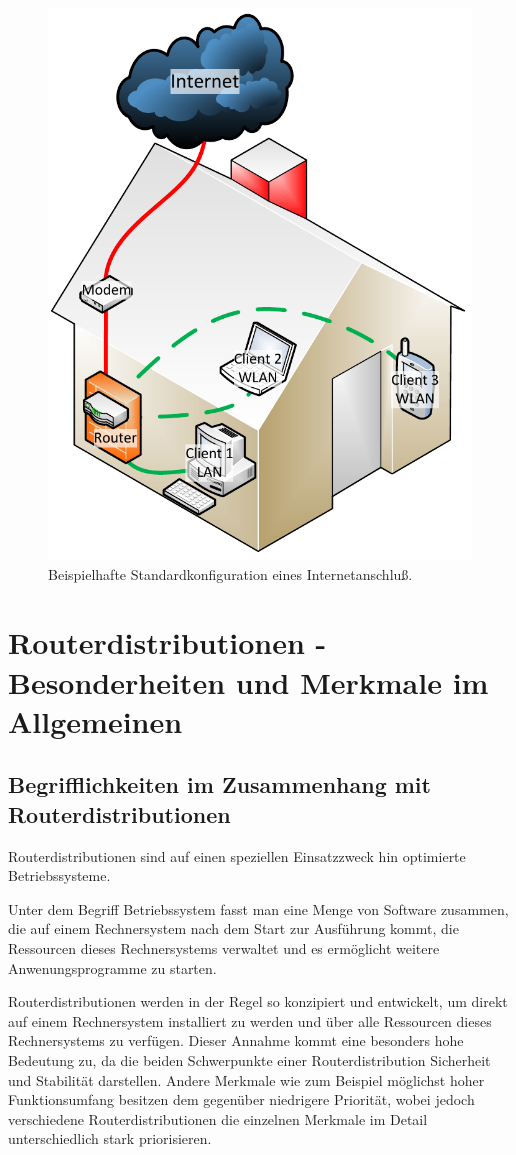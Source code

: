 \documentclass[a4paper,12pt]{scrartcl}
\begin{document}
\begin{figure}[htb]
\begin{center}
 \includegraphics[width=0.65\hsize]{./images/default.pdf}
\end{center}
\caption[Beispielhafte Standardkonfiguration eines Internetanschlu\ss{}, Quelle: Autor, verwendete Symbole unterliegen der
GPL]{\label{stdinet}Beispielhafte Standardkonfiguration eines Internetanschlu\ss{}.}
\end{figure}

\clearpage
\section{Routerdistributionen - Besonderheiten und Merkmale im Allgemeinen}

\subsection{Begrifflichkeiten im Zusammenhang mit Routerdistributionen}
Routerdistributionen sind auf einen speziellen Einsatzzweck hin optimierte
Betriebssysteme.

Unter dem Begriff Betriebssystem fasst man eine Menge von Software zusammen, die
auf einem Rechnersystem nach dem Start zur Ausführung kommt, die Ressourcen
dieses Rechnersystems verwaltet und es ermöglicht weitere Anwenungsprogramme zu
starten.

Routerdistributionen werden in der Regel so konzipiert und entwickelt,
um direkt auf einem Rechnersystem installiert zu werden und über alle Ressourcen
dieses Rechnersystems zu verfügen. Dieser Annahme kommt eine besonders hohe
Bedeutung zu, da die beiden Schwerpunkte einer Routerdistribution Sicherheit und
Stabilität darstellen. Andere Merkmale wie zum Beispiel m\"oglichst hoher
Funktionsumfang besitzen dem gegen\"uber niedrigere Priorit\"at, wobei jedoch
verschiedene Routerdistributionen die einzelnen Merkmale im
Detail unterschiedlich stark priorisieren.
\end{document}
